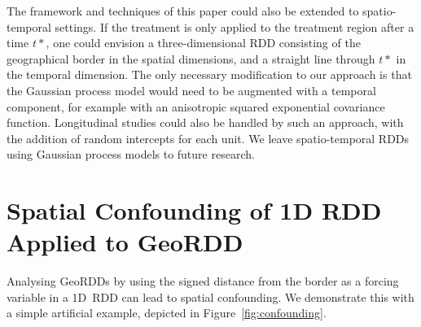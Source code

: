 \documentclass[letter]{article}
\begin{document}
The framework and techniques of this paper could also be extended to spatio-temporal settings.
If the treatment is only applied to the treatment region after a time \(t*\), one could envision a three-dimensional RDD consisting of the geographical border in the spatial dimensions, and a straight line through \(t*\) in the temporal dimension.
The only necessary modification to our approach is that the Gaussian process model would need to be augmented with a temporal component, for example with an anisotropic squared exponential covariance function.
Longitudinal studies could also be handled by such an approach, with the addition of random intercepts for each unit.
We leave spatio-temporal RDDs using Gaussian process models to future research.
    


    	\appendix
    


    	\hypertarget{spatial-confounding-of-1d-rdd-applied-to-geordd}{%
\section{Spatial Confounding of 1D RDD Applied to GeoRDD}\label{spatial-confounding-of-1d-rdd-applied-to-geordd}}
    


    	\label{sec:confounding}
    


    	Analysing GeoRDDs by using the signed distance from the border as a forcing variable in a 1D~RDD can lead to spatial confounding.
We demonstrate this with a simple artificial example, depicted in Figure~\ref{fig:confounding}.
    
\end{document}
